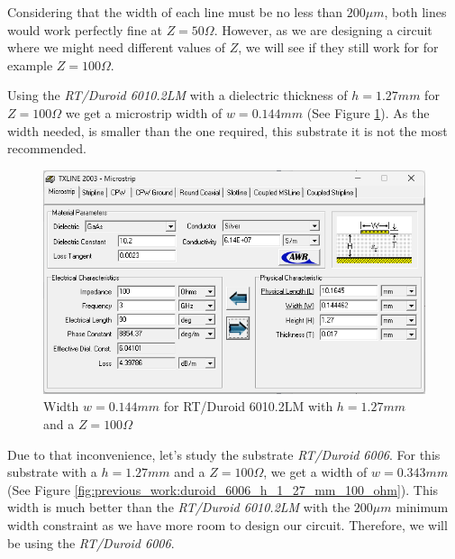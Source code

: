 \documentclass[12pt]{report} %
\begin{document}
Considering that the width of each line must be no less than $200 \mu m$, both lines would work perfectly fine at $Z = 50 \Omega$. However, as we are designing a circuit where we might need different values of $Z$, we will see if they still work for for example $Z = 100 \Omega$.

Using the \textit{RT/Duroid 6010.2LM} with  a dielectric thickness of $h = 1.27 mm$ for $Z = 100 \Omega$ we get a microstrip width of $w = 0.144mm$ (See Figure \ref{fig:previous_work:duroid_6010.2lm_h_1_27_mm_100_ohm}). As the width needed, is smaller than the one required, this substrate it is not the most recommended.

\begin{figure}[htbp]
    \centering
    \includegraphics[width=\textwidth]{images/previous_work/txline_tool_duroid_6010.2lm_h_1_27_mm_100_ohm.png}
    \caption{Width $w = 0.144 mm$ for RT/Duroid 6010.2LM with $h = 1.27 mm$ and a $Z = 100 \Omega$}
    \label{fig:previous_work:duroid_6010.2lm_h_1_27_mm_100_ohm}
\end{figure}

Due to that inconvenience, let's study the substrate \textit{RT/Duroid 6006}. For this substrate with a $h = 1.27 mm$ and a $Z = 100 \Omega$, we get a width of $w = 0.343 mm$ (See Figure \ref{fig:previous_work:duroid_6006_h_1_27_mm_100_ohm}). This width is much better than the \textit{RT/Duroid 6010.2LM} with the $200 \mu m$ minimum width constraint as we have more room to design our circuit. Therefore, we will be using the \textit{RT/Duroid 6006}.
\end{document}
